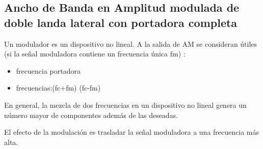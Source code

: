 \documentclass{article}
\begin{document}
\subsection{Ancho de Banda en Amplitud modulada de doble landa lateral con portadora completa}

Un modulador es un dispositivo no lineal. A la salida de AM  se consideran útiles  (si la señal moduladora contiene un frecuencia única fm)  :

\begin{itemize}
    \item frecuencia portadora
    \item frecuencias:(fc+fm)  (fc-fm)    

\end{itemize}

En general, la mezcla de dos frecuencias en un dispositivo no lineal genera un número mayor de componentes además de las deseadas.

El efecto de la modulación es trasladar  la señal moduladora   a una frecuencia más alta.
 







\end{document}
